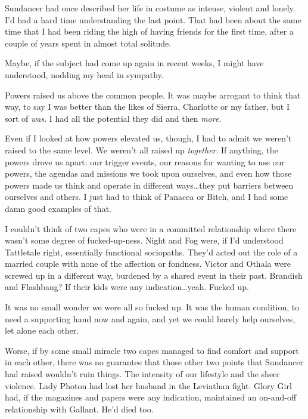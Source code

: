 





Sundancer had once described her life in costume as intense, violent and lonely.  I'd had a hard time understanding the last point.  That had been about the same time that I had been riding the high of having friends for the first time, after a couple of years spent in almost total solitude.



Maybe, if the subject had come up again in recent weeks, I might have understood, nodding my head in sympathy.



Powers raised us above the common people.  It was maybe arrogant to think that way, to say I was better than the likes of Sierra, Charlotte or my father, but I sort of \emph{was}.  I had all the potential they did and then \emph{more}.



Even if I looked at how powers elevated us, though, I had to admit we weren't raised to the same level.  We weren't all raised up \emph{together}.  If anything, the powers drove us apart: our trigger events, our reasons for wanting to use our powers, the agendas and missions we took upon ourselves, and even how those powers made us think and operate in different ways\ldots they put barriers between ourselves and others.  I just had to think of Panacea or Bitch, and I had some damn good examples of that.



I couldn't think of two capes who were in a committed relationship where there wasn't some degree of fucked-up-ness.  Night and Fog were, if I'd understood Tattletale right, essentially functional sociopaths.  They'd acted out the role of a married couple with none of the affection or fondness.  Victor and Othala were screwed up in a different way, burdened by a shared event in their past.  Brandish and Flashbang?  If their kids were any indication\ldots yeah.  Fucked up.



It was no small wonder we were all so fucked up.  It was the human condition, to need a supporting hand now and again, and yet we could barely help ourselves, let alone each other.



Worse, if by some small miracle two capes managed to find comfort and support in each other, there was no guarantee that those other two points that Sundancer had raised wouldn't ruin things.  The intensity of our lifestyle and the sheer violence.  Lady Photon had lost her husband in the Leviathan fight.  Glory Girl had, if the magazines and papers were any indication, maintained an on-and-off relationship with Gallant.  He'd died too.



